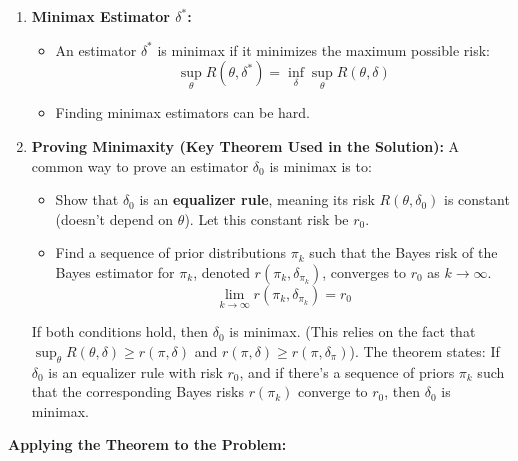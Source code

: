 \begin{enumerate}
	\item \textbf{Minimax Estimator $\delta^*$:}
	\begin{itemize}
		\item An estimator $\delta^*$ is minimax if it minimizes the maximum possible risk:
\[
\sup_\theta R(\theta, \delta^*) = \inf_\delta \sup_\theta R(\theta, \delta)
\]		\item Finding minimax estimators can be hard.
	\end{itemize}
	\item \textbf{Proving Minimaxity (Key Theorem Used in the Solution):}
A common way to prove an estimator $\delta_0$ is minimax is to:
	\begin{itemize}
		\item Show that $\delta_0$ is an \textbf{equalizer rule}, meaning its risk $R(\theta, \delta_0)$ is constant (doesn't depend on $\theta$). Let this constant risk be $r_0$.
		\item Find a sequence of prior distributions $\pi_k$ such that the Bayes risk of the Bayes estimator for $\pi_k$, denoted $r(\pi_k, \delta_{\pi_k})$, converges to $r_0$ as $k \to \infty$.
\[
\lim_{k\to\infty} r(\pi_k, \delta_{\pi_k}) = r_0
\]	\end{itemize}
If both conditions hold, then $\delta_0$ is minimax.
(This relies on the fact that $\sup_\theta R(\theta, \delta) \ge r(\pi, \delta)$ and $r(\pi, \delta) \ge r(\pi, \delta_\pi)$).
The theorem states: If $\delta_0$ is an equalizer rule with risk $r_0$, and if there's a sequence of priors $\pi_k$ such that the corresponding Bayes risks $r(\pi_k)$ converge to $r_0$, then $\delta_0$ is minimax.
\end{enumerate}

\textbf{Applying the Theorem to the Problem:}

